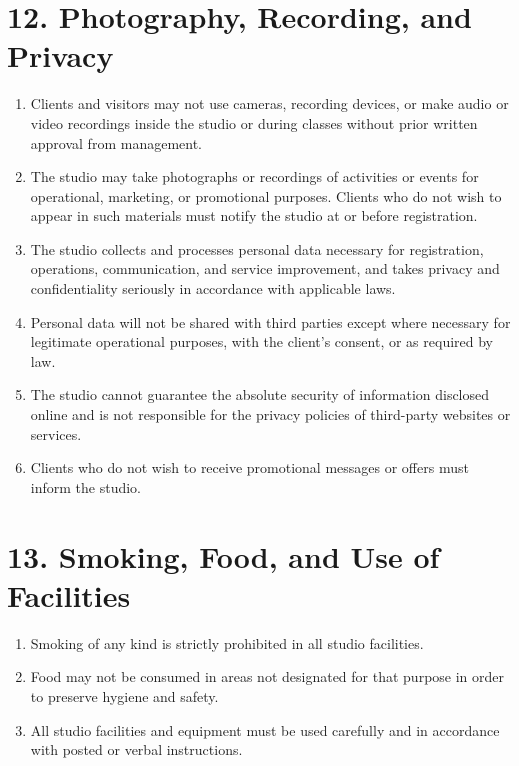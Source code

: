 \documentclass[12pt,a4paper]{article}
\begin{document}
\section*{12. Photography, Recording, and Privacy}
\begin{enumerate}
    \item Clients and visitors may not use cameras, recording devices, or make audio or video recordings inside the studio or during classes without prior written approval from management.
    \item The studio may take photographs or recordings of activities or events for operational, marketing, or promotional purposes. Clients who do not wish to appear in such materials must notify the studio at or before registration.
    \item The studio collects and processes personal data necessary for registration, operations, communication, and service improvement, and takes privacy and confidentiality seriously in accordance with applicable laws.
    \item Personal data will not be shared with third parties except where necessary for legitimate operational purposes, with the client’s consent, or as required by law.
    \item The studio cannot guarantee the absolute security of information disclosed online and is not responsible for the privacy policies of third-party websites or services.
    \item Clients who do not wish to receive promotional messages or offers must inform the studio.
\end{enumerate}

\section*{13. Smoking, Food, and Use of Facilities}
\begin{enumerate}
    \item Smoking of any kind is strictly prohibited in all studio facilities.
    \item Food may not be consumed in areas not designated for that purpose in order to preserve hygiene and safety.
    \item All studio facilities and equipment must be used carefully and in accordance with posted or verbal instructions.
\end{enumerate}
\end{document}
